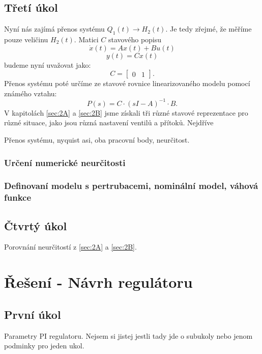 \documentclass[a4paper,11pt]{article}
\begin{document}
\subsection{Třetí úkol}\label{sec:3}
Nyní nás zajímá přenos systému $ Q_{1}\left ( t \right )\rightarrow H_{2}\left ( t \right ) $. Je tedy zřejmé, že měříme pouze veličinu $ H_{2}\left ( t \right ) $. Matici $ C $ stavového popisu
\begin{equation}
\dot{x}\left ( t \right )=Ax\left( t \right )+Bu \left( t \right)\end{equation}
\begin{equation}
y\left ( t \right )=Cx\left( t \right )
\end{equation}
budeme nyní uvažovat jako: $$C=\left [\begin{array}{cc}0 & 1\end{array}\right ].
$$
Přenos systému poté určíme ze stavové rovnice linearizovaného modelu pomocí známého vztahu:
\begin{equation}\label{stav_popis} 
P\left ( s \right )=C\cdot \left ( sI-A \right )^{-1}\cdot B.
\end{equation}
V kapitolách \ref{sec:2A} a \ref{sec:2B} jsme získali tři různé stavové reprezentace pro různé situace, jako jsou různá nastavení ventilů a přítoků. Nejdříve 




Přenos systému, nyquist asi, oba pracovní body, neurčitost.
\subsubsection{Určení numerické neurčitosti}
\subsubsection{Definovaní modelu s pertrubacemi, nominální model, váhová funkce}
\subsection{Čtvrtý úkol}
Porovnání neurčitostí z \ref{sec:2A} a \ref{sec:2B}.
\section{Řešení - Návrh regulátoru}
\subsection{První úkol}
Parametry PI regulatoru. Nejsem si jistej jestli tady jde o subukoly nebo jenom podminky pro jeden ukol.
\end{document}
